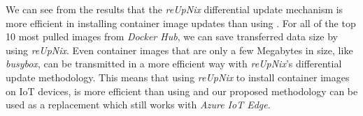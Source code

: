 \noindent
We can see from the results that the \textit{reUpNix} differential update mechanism
is more efficient in installing container image updates than using .
For all of the top 10 most pulled images from \textit{Docker Hub}, we can save
transferred data size by using \textit{reUpNix}. Even container images that are
only a few Megabytes in size, like \textit{busybox}, can be transmitted in a more
efficient way with \textit{reUpNix}'s differential update methodology. This means
that using \textit{reUpNix} to install container images on \ac{IoT} devices, is more
efficient than using  and our proposed methodology can be used
as a replacement which still works with \textit{Azure IoT Edge}.

